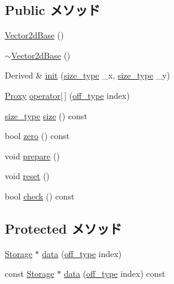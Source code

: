 \subsection*{Public メソッド}
\begin{DoxyCompactItemize}
\item 
\hyperlink{classStats_1_1Vector2dBase_ac15f5b9d9e5fc960adc62ad5854aaac1}{Vector2dBase} ()
\item 
\hyperlink{classStats_1_1Vector2dBase_ab86c0e4e60f8e58a88b7e1945188b243}{$\sim$Vector2dBase} ()
\item 
Derived \& \hyperlink{classStats_1_1Vector2dBase_ab9a02aa81f6a70a71d2dc2c155acbcac}{init} (\hyperlink{namespaceStats_ada51e68d31936547d3729c82daf6b7c6}{size\_\-type} \_\-x, \hyperlink{namespaceStats_ada51e68d31936547d3729c82daf6b7c6}{size\_\-type} \_\-y)
\item 
\hyperlink{classStats_1_1VectorProxy}{Proxy} \hyperlink{classStats_1_1Vector2dBase_ad22583203a39f3bb11549cc89ba71e9d}{operator\mbox{[}$\,$\mbox{]}} (\hyperlink{namespaceStats_a2773c9fa9e4b0b04a46b37494b44842a}{off\_\-type} index)
\item 
\hyperlink{namespaceStats_ada51e68d31936547d3729c82daf6b7c6}{size\_\-type} \hyperlink{classStats_1_1Vector2dBase_a503ab01f6c0142145d3434f6924714e7}{size} () const 
\item 
bool \hyperlink{classStats_1_1Vector2dBase_a4e72b01b727d3165e75cba84eb507491}{zero} () const 
\item 
void \hyperlink{classStats_1_1Vector2dBase_a1825b40ca3bc3a1ba67fdb58fac5015c}{prepare} ()
\item 
void \hyperlink{classStats_1_1Vector2dBase_ad20897c5c8bd47f5d4005989bead0e55}{reset} ()
\item 
bool \hyperlink{classStats_1_1Vector2dBase_a6ecddb2c44556b7acbc1723a968ff8bb}{check} () const 
\end{DoxyCompactItemize}
\subsection*{Protected メソッド}
\begin{DoxyCompactItemize}
\item 
\hyperlink{classStats_1_1Vector2dBase_a5d4a6db0e7c32292f54a08d05c671bd1}{Storage} $\ast$ \hyperlink{classStats_1_1Vector2dBase_ad9077db0c8f34051d2e7766c947aa7b2}{data} (\hyperlink{namespaceStats_a2773c9fa9e4b0b04a46b37494b44842a}{off\_\-type} index)
\item 
const \hyperlink{classStats_1_1Vector2dBase_a5d4a6db0e7c32292f54a08d05c671bd1}{Storage} $\ast$ \hyperlink{classStats_1_1Vector2dBase_a53a38df6a99d518a4016d9635235cc44}{data} (\hyperlink{namespaceStats_a2773c9fa9e4b0b04a46b37494b44842a}{off\_\-type} index) const 
\end{DoxyCompactItemize}
